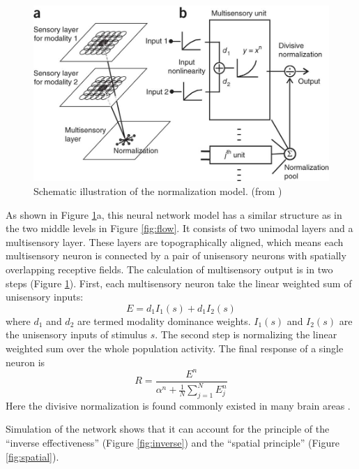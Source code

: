 \documentclass{article}[11pt]
\begin{document}
\begin{figure}[tpb]
  \centering
  \includegraphics[width=.8\textwidth]{normalize}
  \caption{Schematic illustration of the normalization model. (from \cite{ohshiro_normalization_2011})}
  \label{fig:normalize}
\end{figure}

As shown in Figure \ref{fig:normalize}a, this neural network model has a similar structure as in the two middle levels in Figure \ref{fig:flow}. It consists of two unimodal layers and a multisensory layer. These layers are topographically aligned, which means each multisensory neuron is connected by a pair of unisensory neurons with spatially overlapping receptive fields. The calculation of multisensory output is in two steps (Figure \ref{fig:normalize}). First, each multisensory neuron take the linear weighted sum of unisensory inputs:
\begin{equation}
  E = d_1 I_1(s) + d_1 I_2(s)
  \label{eq:step1}
\end{equation}
where $d_1$ and $d_2$ are termed modality dominance weights. $I_1(s)$ and $I_2(s)$ are the unisensory inputs of stimulus $s$. The second step is normalizing the linear weighted sum over the whole population activity. The final response of a single neuron is
\begin{equation}
  R = \frac{E^n}{\alpha^n+\frac{1}{N}\sum_{j=1}^N E_j^n}
  \label{eq:step2}
\end{equation}
Here the divisive normalization is found commonly existed in many brain areas \cite{carandini_normalization_2012}.

Simulation of the network shows that it can account for the principle of the ``inverse effectiveness'' (Figure \ref{fig:inverse}) and the ``spatial principle'' (Figure \ref{fig:spatial}). 
\end{document}

